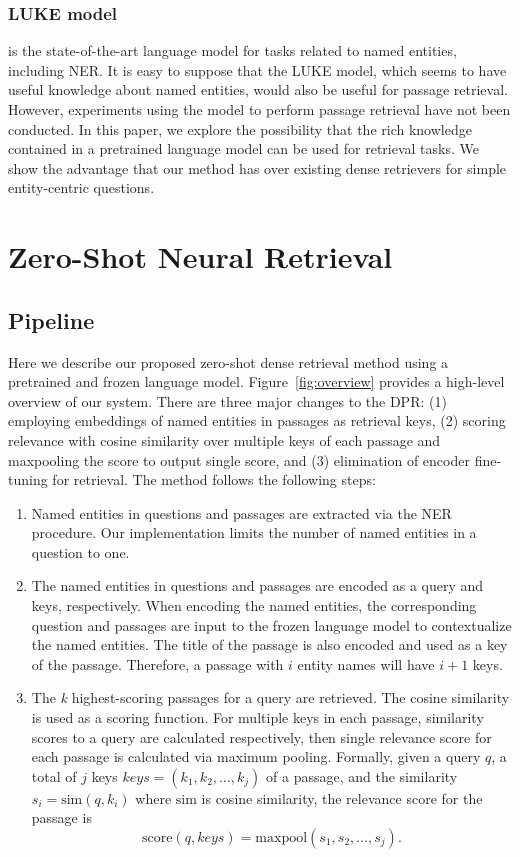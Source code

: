 \documentclass[letterpaper]{article} \usepackage{aaai23}  \usepackage{times}  \usepackage{helvet}  \usepackage{courier}  \usepackage[hyphens]{url}  \usepackage{graphicx} \urlstyle{rm} \def\UrlFont{\rm}  \usepackage{natbib}  \usepackage{caption} \frenchspacing  \setlength{\pdfpagewidth}{8.5in}  \setlength{\pdfpageheight}{11in}  \usepackage{algorithm}
\begin{document}
\subsubsection{LUKE model} \citep{yamada-etal-2020-luke} is the state-of-the-art language model for tasks related to named entities, including NER.
It is easy to suppose that the LUKE model, which seems to have useful knowledge about named entities, would also be useful for passage retrieval.
However, experiments using the model to perform passage retrieval have not been conducted.
In this paper, we explore the possibility that the rich knowledge contained in a pretrained language model can be used for retrieval tasks.
We show the advantage that our method has over existing dense retrievers for simple entity-centric questions.


\section{Zero-Shot Neural Retrieval}\label{sec:method}
\subsection{Pipeline}\label{sec:pipeline}
Here we describe our proposed zero-shot dense retrieval method using a pretrained and frozen language model.
Figure~\ref{fig:overview} provides a high-level overview of our system.
There are three major changes to the DPR: (1) employing embeddings of named entities in passages as retrieval keys, (2) scoring relevance with cosine similarity over multiple keys of each passage and maxpooling the score to output single score, and (3) elimination of encoder fine-tuning for retrieval.
The method follows the following steps:
\begin{enumerate}
	\item Named entities in questions and passages are extracted via the NER procedure.
	      Our implementation limits the number of named entities in a question to one.
	\item The named entities in questions and passages are encoded as a query and keys, respectively.
	      When encoding the named entities, the corresponding question and passages are input to the frozen language model to contextualize the named entities.
	      The title of the passage is also encoded and used as a key of the passage.
	      Therefore, a passage with $i$ entity names will have $i+1$ keys.
	\item The \textit{k} highest-scoring passages for a query are retrieved.
	      The cosine similarity is used as a scoring function.
	      For multiple keys in each passage, similarity scores to a query are calculated respectively, then single relevance score for each passage is calculated via maximum pooling.
	      Formally, given a query $q$, a total of $j$ keys $keys = (k_1, k_2, \dots, k_j)$ of a passage, and the similarity $s_i = \text{sim}(q, k_i)$ where $\text{sim}$ is cosine similarity, the relevance score for the passage is
	      \[
		      \text{score}(q, keys) = \text{maxpool}(s_1, s_2, \dots, s_j).
	      \]
\end{enumerate}
\end{document}
